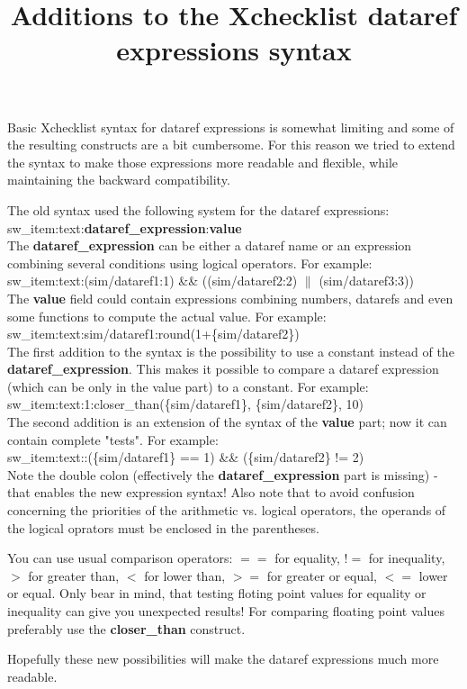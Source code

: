 \documentclass[a4paper]{article}
\title{Additions to the Xchecklist dataref expressions syntax}
\begin{document}
\maketitle

Basic Xchecklist syntax for dataref expressions is somewhat limiting and some of the resulting constructs are a bit cumbersome. For this reason we tried to extend the syntax to make those expressions more readable and flexible, while maintaining the backward compatibility.

The old syntax used the following system for the dataref expressions: \\

sw\_item:text:\textbf{dataref\_expression}:\textbf{value}  \\

The \textbf{dataref\_expression} can be either a dataref name or an expression combining several conditions using logical operators.
For example: \\

sw\_item:text:(sim/dataref1:1) \&\& ((sim/dataref2:2) $\|$ (sim/dataref3:3)) \\

The \textbf{value} field could contain expressions combining numbers, datarefs and even some functions to compute the actual value.
For example: \\

sw\_item:text:sim/dataref1:round(1+\{sim/dataref2\}) \\

The first addition to the syntax is the possibility to use a constant instead of the \textbf{dataref\_expression}. This makes it possible to compare a dataref expression (which can be only in the value part) to a constant.
For example: \\

sw\_item:text:1:closer\_than(\{sim/dataref1\}, \{sim/dataref2\}, 10) \\

The second addition is an extension of the syntax of the \textbf{value} part; now it can contain complete "tests".
For example: \\

sw\_item:text::(\{sim/dataref1\} == 1) \&\& (\{sim/dataref2\} != 2) \\

Note the double colon (effectively the \textbf{dataref\_expression} part is missing) - that enables the new expression syntax!
Also note that to avoid confusion concerning the priorities of the arithmetic vs. logical operators, the operands of the logical oprators must be enclosed in the parentheses.

You can use usual comparison operators: $==$ for equality, $!=$ for inequality, $>$ for greater than, $<$ for lower than, $>=$ for greater or equal, $<=$ lower or equal. Only bear in mind, that testing floting point values for equality or inequality can give you unexpected results! For comparing floating point values preferably use the \textbf{closer\_than} construct.

Hopefully these  new possibilities will make the dataref expressions much more readable.
\end{document}
